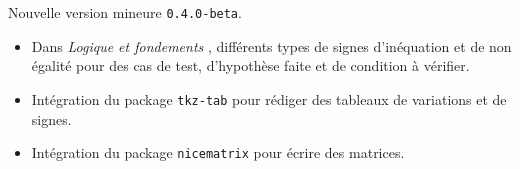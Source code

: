 Nouvelle version mineure \verb+0.4.0-beta+.

\begin{itemize}[itemsep=.5em]
    \item Dans \emph{\og Logique et fondements \fg}, différents types de signes d'inéquation et de non égalité pour des cas de test, d'hypothèse faite et de condition à vérifier.




    \item Intégration du package \verb+tkz-tab+ pour rédiger des tableaux de variations et de signes.




    \item Intégration du package \verb+nicematrix+ pour écrire des matrices.
\end{itemize}
